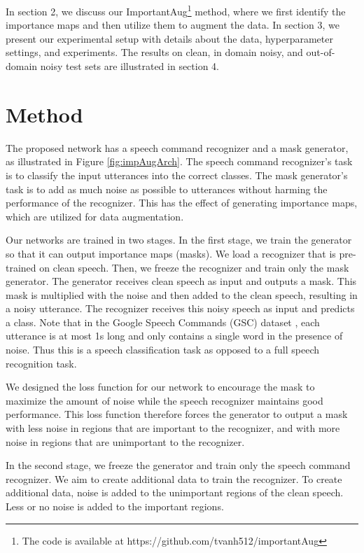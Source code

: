 \documentclass{article}
\begin{document}
In section 2, we discuss our ImportantAug\footnote[1]{The code is available at https://github.com/tvanh512/importantAug} method, where we first identify the importance maps and then utilize them to augment the data. In
section 3, we present our experimental setup with details about the data, hyperparameter settings, and experiments. The results on clean, in domain
noisy, and out-of-domain noisy test sets are illustrated in section 4. 


\section{Method}

The proposed network has a speech command recognizer and a mask generator, as illustrated in Figure \ref{fig:impAugArch}. The speech command recognizer's task is to classify the input utterances into the correct classes. The mask generator's task is to add as much noise as possible to utterances without harming the performance of the recognizer. This has the effect of generating importance maps, which are utilized for data augmentation. 

Our networks are trained in two stages. In the first stage, we train the generator so that it can output importance maps (masks). We load a recognizer that is pre-trained on clean speech. Then, we freeze the recognizer and train only the mask generator. The generator receives clean speech as input and outputs a mask. This mask is multiplied with the noise and then added to the clean speech, resulting in a noisy utterance. The recognizer receives this noisy speech as input and predicts a class. Note that in the Google Speech Commands (GSC) dataset \cite{warden2018speech}, each utterance is at most 1s long and only contains a single word in the presence of noise. 
Thus this is a speech classification task as opposed to a full speech recognition task.

We designed the loss function for our network to encourage the mask to maximize the amount of noise while the speech recognizer maintains good performance. This loss function therefore forces the generator to output a mask with less noise in regions that are important to the recognizer, and with more noise in regions that are unimportant to the recognizer. 




In the second stage, we freeze the generator and train only the speech command recognizer. We aim to create additional data to train the recognizer. To create additional data, noise is added to the unimportant regions of the clean speech. Less or no noise is added to the important regions. 
\end{document}
